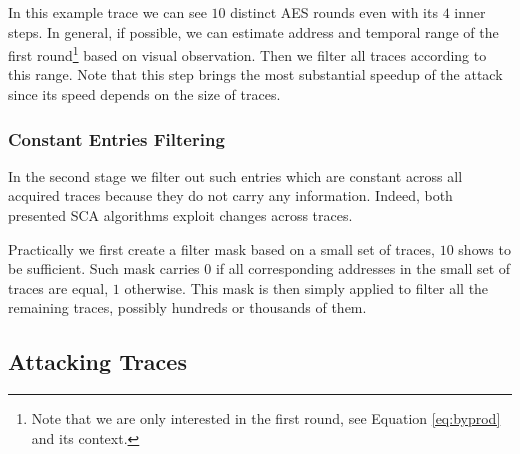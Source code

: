 In this example trace we can see $10$ distinct AES rounds even with its $4$ inner steps. In general, if possible, we can estimate address and temporal range of the first round\footnote{Note that we are only interested in the first round, see Equation \ref{eq:byprod} and its context.} based on visual observation. Then we filter all traces according to this range. Note that this step brings the most substantial speedup of the attack since its speed depends on the size of traces.

\subsubsection{Constant Entries Filtering}

In the second stage we filter out such entries which are constant across all acquired traces because they do not carry any information. Indeed, both presented SCA algorithms exploit changes across traces.

Practically we first create a filter mask based on a small set of traces, $10$ shows to be sufficient. Such mask carries $0$ if all corresponding addresses in the small set of traces are equal, $1$ otherwise. This mask is then simply applied to filter all the remaining traces, possibly hundreds or thousands of them.

\subsection{Attacking Traces}
\label{sec:attack}

